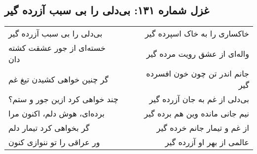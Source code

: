 \begin{center}
\section*{غزل شماره ۱۳۱: بی‌دلی را بی سبب آزرده گیر}
\label{sec:131}
\begin{longtable}{l p{0.5cm} r}
بی‌دلی را بی سبب آزرده گیر
&&
خاکساری را به خاک اسپرده گیر
\\
خسته‌ای از جور عشقت کشته دان
&&
واله‌ای از عشق رویت مرده گیر
\\
گر چنین خواهی کشیدن تیغ غم
&&
جانم اندر تن چون خون افسرده گیر
\\
چند خواهی کرد ازین جور و ستم؟
&&
بی‌دلی از غم به جان آزرده گیر
\\
برده‌ای، هوش دلم، اکنون مرا
&&
نیم جانی مانده وین هم برده گیر
\\
گر بخواهی کرد تیمار دلم
&&
از غم و تیمار جانم خرده گیر
\\
ور عراقی را تو ننوازی کنون
&&
عالمی از بهر او آزرده گیر
\\
\end{longtable}
\end{center}
